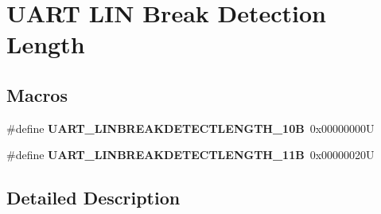 \hypertarget{group___u_a_r_t___l_i_n___break___detection___length}{}\section{U\+A\+RT L\+IN Break Detection Length}
\label{group___u_a_r_t___l_i_n___break___detection___length}
\subsection*{Macros}
\begin{DoxyCompactItemize}
\item 
\mbox{\label{group___u_a_r_t___l_i_n___break___detection___length_ga027616b7a36b36e0e51ffee947533624}} 
\#define {\bfseries U\+A\+R\+T\+\_\+\+L\+I\+N\+B\+R\+E\+A\+K\+D\+E\+T\+E\+C\+T\+L\+E\+N\+G\+T\+H\+\_\+10B}~0x00000000U
\item 
\mbox{\label{group___u_a_r_t___l_i_n___break___detection___length_ga2f66fcd37de7a3ca9e1101305f2e23e6}} 
\#define {\bfseries U\+A\+R\+T\+\_\+\+L\+I\+N\+B\+R\+E\+A\+K\+D\+E\+T\+E\+C\+T\+L\+E\+N\+G\+T\+H\+\_\+11B}~0x00000020U
\end{DoxyCompactItemize}


\subsection{Detailed Description}
